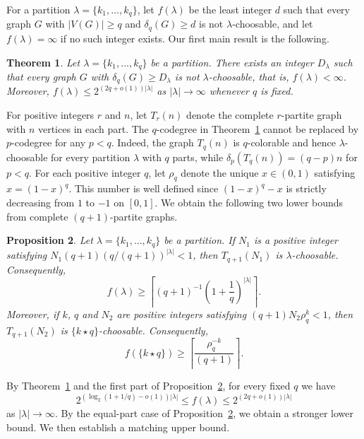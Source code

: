 \documentclass[10pt,a4paper]{amsart}
\numberwithin{equation}{section}
\newtheorem{theorem}{Theorem}[section]
\newtheorem{proposition}[theorem]{Proposition}
\newcommand{\equalparts}[2]{\{#1\star #2\}}
\begin{document}
For a partition $\lambda=\{k_1,\ldots,k_q\}$, let $f(\lambda)$ be the least
integer $d$ such that every graph $G$ with $|V(G)|\geq q$ and
$\delta_q(G)\geq d$ is not $\lambda$-choosable, and let
$f(\lambda)=\infty$ if no such integer exists.
Our first main result is the following.


\begin{theorem}\label{thm:existence}
Let $\lambda=\{k_1,\ldots,k_q\}$ be a partition. There exists an integer
$D_\lambda$ such that every graph $G$ with $\delta_q(G)\geq D_\lambda$
is not $\lambda$-choosable, that is, $f(\lambda)<\infty$. Moreover,
$f(\lambda)\leq 2^{(2q+o(1))|\lambda|}$  as $|\lambda|\to\infty$
whenever $q$ is fixed.
\end{theorem}


For positive integers $r$ and $n$, let $T_r(n)$ denote the complete
$r$-partite graph with $n$ vertices in each part. The $q$-codegree in
Theorem~\ref{thm:existence} cannot be replaced by $p$-codegree for any $p < q$.
Indeed, the graph $T_q(n)$ is
$q$-colorable and hence $\lambda$-choosable for every partition $\lambda$ with
$q$ parts, while $\delta_p(T_q(n)) = (q - p)n$ for $p < q$.
For each positive integer $q$, let $\rho_q$ denote the unique $x\in(0,1)$
satisfying $x=(1-x)^q$. This number is well defined since
$(1-x)^q-x$ is strictly decreasing from $1$ to $-1$ on $[0,1]$.
We obtain the following two lower bounds from complete $(q+1)$-partite graphs.

\begin{proposition}\label{prop:lower-threshold}
Let $\lambda=\{k_1,\ldots,k_q\}$ be a partition. If $N_1$ is a positive integer satisfying
$N_1(q+1)(q/(q+1))^{|\lambda|}<1$,
then $T_{q+1}(N_1)$ is $\lambda$-choosable. Consequently,
\[
f(\lambda)\geq\left\lceil(q+1)^{-1}(1+\frac{1}{q})^{|\lambda|}\right\rceil.
\]
Moreover, if $k$, $q$ and $N_2$ are positive integers satisfying
$(q+1)N_2\rho_q^k<1$,
then $T_{q+1}(N_2)$ is $\equalparts{k}{q}$-choosable. Consequently,
\[
f(\equalparts{k}{q})\geq\left\lceil \frac{\rho_q^{-k}}{(q+1)}\right\rceil.
\]
\end{proposition}

By Theorem~\ref{thm:existence} and the first part of
Proposition~\ref{prop:lower-threshold}, for every fixed $q$ we have
\[
 2^{(\log_2(1+1/q)-o(1))|\lambda|}
 \leq f(\lambda)
 \leq 2^{(2q+o(1))|\lambda|}
\]
as
$|\lambda|\to\infty$. By the equal-part case of
Proposition~\ref{prop:lower-threshold}, we obtain a stronger lower bound. We
then establish a matching upper bound.
\end{document}
